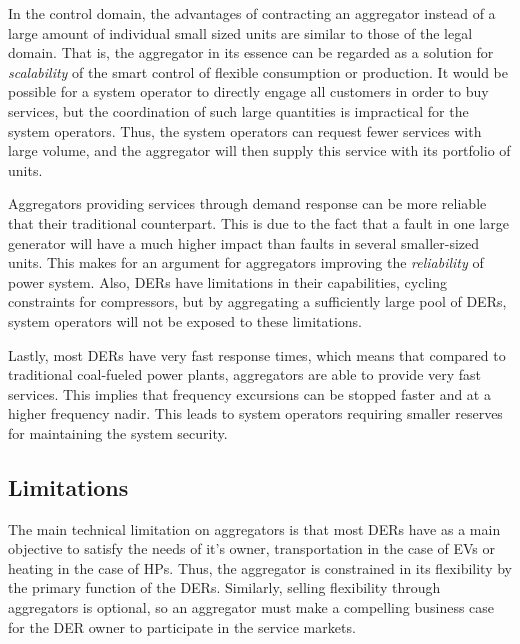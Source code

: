 In the control domain, the advantages of contracting an aggregator instead of a large amount of individual small sized units are similar to those of the legal domain. That is, the aggregator in its essence can be regarded as a solution for \emph{scalability} of the smart control of flexible consumption or production. It would be possible for a system operator to directly engage all customers in order to buy services, but the coordination of such large quantities is impractical for the system operators. Thus, the system operators can request fewer services with large volume, and the aggregator will then supply this service with its portfolio of units.

Aggregators providing services through demand response can be more reliable that their traditional counterpart. This is due to the fact that a fault in one large generator will have a much higher impact than faults in several smaller-sized units. This makes for an argument for aggregators improving the \emph{reliability} of power system. Also, DERs have limitations in their capabilities, \eg cycling constraints for compressors, but by aggregating a sufficiently large pool of DERs, system operators will not be exposed to these limitations. 

Lastly, most DERs have very fast response times, which means that compared to traditional coal-fueled power plants, aggregators are able to provide very fast services. This implies that frequency excursions can be stopped faster and at a higher frequency nadir. This leads to system operators requiring smaller reserves for maintaining  the system security.

\subsection*{Limitations}
The main technical limitation on aggregators is that most DERs have as a main objective to satisfy the needs of it's owner, \eg transportation in the case of EVs or heating in the case of HPs. Thus, the aggregator is constrained in its flexibility by the primary function of the DERs. Similarly, selling flexibility through aggregators is optional, so an aggregator must make a compelling business case for the DER owner to participate in the service markets.

